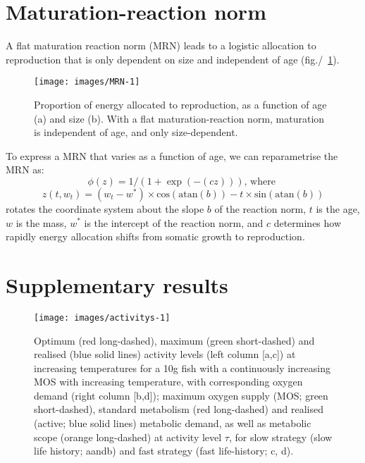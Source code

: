 \documentclass[11pt]{article}\usepackage[]{graphicx}\usepackage[]{color}
\makeatletter
\def\maxwidth{ %
  \ifdim\Gin@nat@width>\linewidth
    \linewidth
  \else
    \Gin@nat@width
  \fi
}
\makeatother
\begin{document}
\section*{Maturation-reaction norm}
\label{sec:MRN}

A flat maturation reaction norm (MRN) leads to a logistic allocation to reproduction that is only dependent on size and independent of age (fig./~\ref{fig:MRN}).

\begin{figure}

{\centering \texttt{[image: images/MRN-1]} 

}

\caption[Proportion of energy allocated to reproduction, as a function of age (a) and size (b)]{Proportion of energy allocated to reproduction, as a function of age (a) and size (b). With a flat maturation-reaction norm, maturation is independent of age, and only size-dependent.}\label{fig:MRN}
\end{figure}



To express a MRN that varies as a function of age, we can reparametrise the MRN as:
$$\phi(z) = 1/(1+\exp(-(c z))) \text{, where }$$
$$z(t, w_t) = (w_t-w^*)\times \text{cos}(\text{atan}(b))-t\times \text{sin}(\text{atan}(b))$$  
rotates the coordinate system about the slope $b$ of the reaction norm, $t$ is the age, $w$ is the mass, $w^*$ is the intercept of the reaction norm, and $c$ determines how rapidly energy allocation shifts from somatic growth to reproduction. 

\section*{Supplementary results}

\begin{figure}
\centering

\texttt{[image: images/activitys-1]} 

\caption{Optimum (red long-dashed), maximum (green short-dashed) and realised (blue solid lines) activity levels (left column [a,c]) at increasing temperatures for a 10g fish with a continuously increasing MOS with increasing temperature, with corresponding oxygen demand (right column [b,d]); maximum oxygen supply (MOS; green short-dashed), standard metabolism (red long-dashed) and realised (active; blue solid lines) metabolic demand, as well as metabolic scope (orange long-dashed) at activity level $\tau$, for slow strategy (slow life history; aandb) and fast strategy (fast life-history; c, d).}
\label{fig:activity-rising}
\end{figure}
\end{document}
